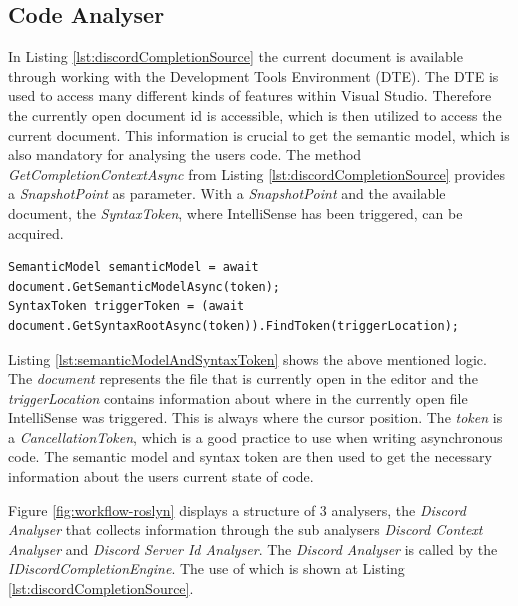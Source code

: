 \subsection{Code Analyser}
\label{ssec:CodeAnalyzer}
In Listing \ref{lst:discordCompletionSource} the current document is available through working with the Development Tools Environment (DTE). The DTE is used to access many different kinds of features within Visual Studio. Therefore the currently open document id is accessible, which is then utilized to access the current document. This information is crucial to get the semantic model, which is also mandatory for analysing the users code. The method \textit{GetCompletionContextAsync} from Listing \ref{lst:discordCompletionSource} provides a \textit{SnapshotPoint} as parameter. With a \textit{SnapshotPoint} and the available document, the \textit{SyntaxToken}, where IntelliSense has been triggered, can be acquired.
\begin{lstlisting}[style=CSharp, caption={Getting the semantic model and syntax token}, label={lst:semanticModelAndSyntaxToken}]
SemanticModel semanticModel = await document.GetSemanticModelAsync(token);
SyntaxToken triggerToken = (await document.GetSyntaxRootAsync(token)).FindToken(triggerLocation);
\end{lstlisting}

Listing \ref{lst:semanticModelAndSyntaxToken} shows the above mentioned logic. The \textit{document} represents the file that is currently open in the editor and the \textit{triggerLocation} contains information about where in the currently open file IntelliSense was triggered. This is always where the cursor position. The \textit{token} is a \textit{CancellationToken}, which is a good practice to use when writing asynchronous code. The semantic model and syntax token are then used to get the necessary information about the users current state of code.


Figure \ref{fig:workflow-roslyn} displays a structure of 3 analysers, the \textit{Discord Analyser} that collects information through the sub analysers \textit{Discord Context Analyser} and \textit{Discord Server Id Analyser}. The \textit{Discord Analyser} is called by the \textit{IDiscordCompletionEngine}. The use of which is shown at Listing \ref{lst:discordCompletionSource}.

